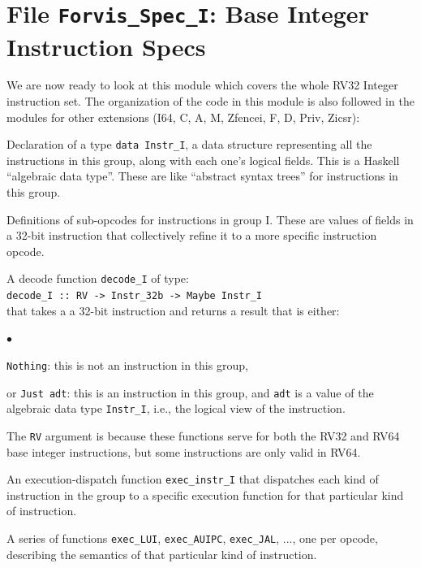 \documentclass[11pt]{article}
\newcommand{\hmm}{\hspace*{2em}}
\newenvironment{tightlist}%
{\begin{list}{$\bullet$}{%
    \setlength{\topsep}{0in}
    \setlength{\partopsep}{0in}
    \setlength{\itemsep}{0in}
    \setlength{\parsep}{0in}
    \setlength{\leftmargin}{1.5em}
    \setlength{\rightmargin}{0in}
    \setlength{\itemindent}{0in}
}
}%
{\end{list}
}
\begin{document}



\section{File {\tt Forvis\_Spec\_I}: Base Integer Instruction Specs}

\label{sec_ISA_spec_I}

We are now ready to look at this module which covers the whole RV32
Integer instruction set.  The organization of the code in this module
is also followed in the modules for other extensions (I64, C, A, M,
Zfencei, F, D, Priv, Zicsr):

\begin{itemize}

\item Declaration of a type \verb|data Instr_I|, a data structure
representing all the instructions in this group, along with each one's
logical fields.  This is a Haskell ``algebraic data type''.  These are
like ``abstract syntax trees'' for instructions in this group.

\item Definitions of sub-opcodes for instructions in group I.  These
are values of fields in a 32-bit instruction that collectively refine
it to a more specific instruction opcode.

\item A decode function \verb|decode_I| of type: \\
\hmm \verb|decode_I :: RV -> Instr_32b -> Maybe Instr_I| \\
that takes a a 32-bit instruction and returns a result that is either:
  \begin{tightlist}

    \item \verb|Nothing|: this is not an instruction in this group,

    \item or \verb|Just adt|: this is an instruction in this group,
    and \verb|adt| is a value of the algebraic data type
    \verb|Instr_I|, i.e., the logical view of the instruction.

  \end{tightlist}
  The \verb|RV| argument is because these functions serve for both the
  RV32 and RV64 base integer instructions, but some instructions are
  only valid in RV64.

\item An execution-dispatch function \verb|exec_instr_I| that
dispatches each kind of instruction in the group to a specific
execution function for that particular kind of instruction.

\item A series of functions \verb|exec_LUI|, \verb|exec_AUIPC|,
\verb|exec_JAL|, ..., one per opcode, describing the semantics of that
particular kind of instruction.

\end{itemize}
\end{document}

